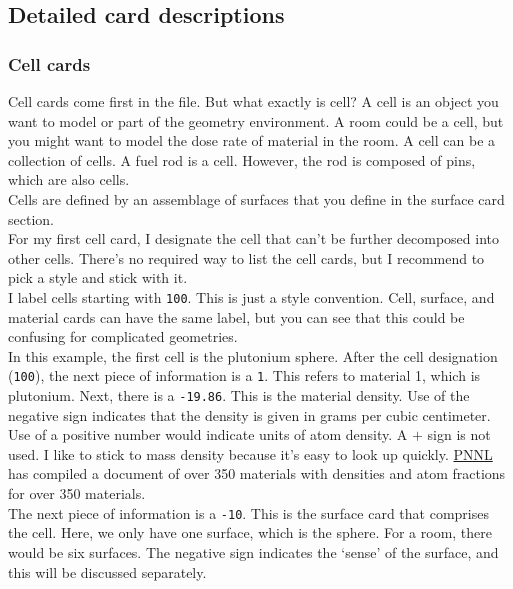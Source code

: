 \documentclass[11pt,a4paper]{article}
\begin{document}
\subsection{Detailed card descriptions}
\subsubsection{Cell cards}
\noindent Cell cards come first in the file. But what exactly is cell? A cell is an object you want to model or part of the geometry environment. A room could be a cell, but you might want to model the dose rate of material in the room. A cell can be a collection of cells. A fuel rod is a cell. However, the rod is composed of pins, which are also cells. \\

\noindent Cells are defined by an assemblage of surfaces that you define in the surface card section.\\

\noindent For my first cell card, I designate the cell that can't be further decomposed into other cells. There's no required way to list the cell cards, but I recommend to pick a style and stick with it. \\

\noindent I label cells starting with \texttt{100}. This is just a style convention. Cell, surface, and material cards can have the same label, but you can see that this could be confusing for complicated geometries. \\

\noindent In this example, the first cell is the plutonium sphere. After the cell designation (\texttt{100}), the next piece of information is a \texttt{1}. This refers to material 1, which is plutonium. Next, there is a \texttt{-19.86}. This is the material density. Use of the negative sign indicates that the density is given in grams per cubic centimeter. Use of a positive number would indicate units of atom density. A $+$ sign is not used. I like to stick to mass density because it's easy to look up
quickly. \href{https://www.pnnl.gov/main/publications/external/technical_reports/PNNL-15870Rev1.pdf}{PNNL} has compiled a document of over 350 materials with densities and atom fractions for over 350 materials. \\

\noindent The next piece of information is a \texttt{-10}. This is the surface card that comprises the cell. Here, we only have one surface, which is the sphere. For a room, there would be six surfaces. The negative sign indicates the `sense' of the surface, and this will be discussed separately. \\
\end{document}
